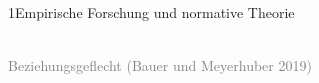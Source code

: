 \documentclass[xcolor=table,9pt,aspectratio=169]{beamer}
\begin{document}
\begin{frame}{\vspace*{10mm}1\hspace*{1em}Empirische Forschung und normative Theorie}
\begin{center}
   \\
   \textcolor{gray}{Beziehungsgeflecht (Bauer und Meyerhuber 2019)}
\end{center}
\end{frame}
\end{document}
